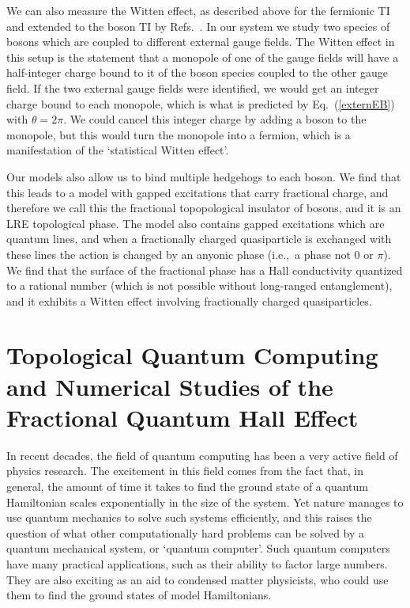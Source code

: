 We can also measure the Witten effect, as described above for the fermionic TI and extended to the boson TI by Refs.~\cite{Max,MaxWitten}. In our system we study two species of bosons which are coupled to different external gauge fields. The Witten effect in this setup is the statement that a monopole of one of the gauge fields will have a half-integer charge bound to it of the boson species coupled to the other gauge field. If the two external gauge fields were identified, we would get an integer charge bound to each monopole, which is what is predicted by Eq.~(\ref{externEB}) with $\theta=2\pi$. We could cancel this integer charge by adding a boson to the monopole, but this would turn the monopole into a fermion, which is a manifestation of the `statistical Witten effect'\cite{Max,MaxWitten}.

Our models also allow us to bind multiple hedgehogs to each boson. We find that this leads to a model with gapped excitations that carry fractional charge, and therefore we call this the fractional topopological insulator of bosons, and it is an LRE topological phase. The model also contains gapped excitations which are quantum lines, and when a fractionally charged quasiparticle is exchanged with these lines the action is changed by an anyonic phase (i.e.,~a phase not $0$ or $\pi$). We find that the surface of the fractional phase has a Hall conductivity quantized to a rational number (which is not possible without long-ranged entanglement), and it exhibits a Witten effect involving fractionally charged quasiparticles.

\section{Topological Quantum Computing and Numerical Studies of the Fractional Quantum Hall Effect}

In recent decades, the field of quantum computing has been a very active field of physics research. The excitement in this field comes from the fact that, in general, the amount of time it takes to find the ground state of a quantum Hamiltonian scales exponentially in the size of the system. Yet nature manages to use quantum mechanics to solve such systems efficiently, and this raises the question of what other computationally hard problems can be solved by a quantum mechanical system, or `quantum computer'. Such quantum computers have many practical applications, such as their ability to factor large numbers. They are also exciting as an aid to condensed matter physicists, who could use them to find the ground states of model Hamiltonians.

